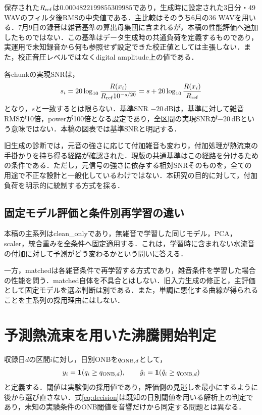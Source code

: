 保存された$R_{\rm ref}$は$0.0004822199855309985$であり，生成時に設定された3日分・49 WAVのフィルタ後RMSの中央値である\cite{localData}．主比較はそのうち6月の36 WAVを用いる．7月9日の録音は雑音基準の算出母集団に含まれるが，本稿の性能評価へ追加したものではない．この基準はデータ生成時の共通負荷を定義するものであり，実運用で未知録音から何も参照せず設定できた校正値としては主張しない．また，校正音圧レベルではなくdigital amplitude上の値である．

各chunkの実現SNRは，
\begin{equation}\label{eq:realized}
 s_i=20\log_{10}\frac{R(x_i)}{R_{\rm ref}10^{-s/20}}
 =s+20\log_{10}\frac{R(x_i)}{R_{\rm ref}}
\end{equation}
となり，$s$と一致するとは限らない．基準SNR $-20$\,dBは，基準に対して雑音RMSが10倍，powerが100倍となる設定であり，全区間の実現SNRが$-20$\,dBという意味ではない．本稿の図表では基準SNRと明記する．

旧生成の診断では，元音の強さに応じて付加雑音も変わり，付加処理が熱流束の手掛かりを持ち得る経路が確認された．現版の共通基準はこの経路を分けるための条件である．ただし，元信号の強さに依存する相対SNRそのものを，全ての用途で不正な設計と一般化しているわけではない．本研究の目的に対して，付加負荷を明示的に統制する方式を採る．

\subsection{固定モデル評価と条件別再学習の違い}
本稿の主系列はclean\_onlyであり，無雑音で学習した同じモデル，PCA，scaler，統合重みを全条件へ固定適用する．これは，学習時に含まれない水流音の付加に対して予測がどう変わるかという問いに答える．

一方，matchedは各雑音条件で再学習する方式であり，雑音条件を学習した場合の性能を問う．matched自体を不具合とはしない．旧入力生成の修正と，主評価として固定モデルを選ぶ判断は別である．また，単調に悪化する曲線が得られることを主系列の採用理由にはしない．

\section{予測熱流束を用いた沸騰開始判定}
収録日$d$の区間$i$に対し，日別ONBを$q_{\mathrm{ONB},d}$として，
\begin{equation}\label{eq:decision}
 y_i=\mathbf{1}(q_i\ge q_{\mathrm{ONB},d}),\qquad
 \hat y_i=\mathbf{1}(\hat q_i\ge q_{\mathrm{ONB},d})
\end{equation}
と定義する．閾値は実験側の採用値であり，評価側の見逃しを最小にするように後から選び直さない．式\eqref{eq:decision}は既知の日別閾値を用いる解析上の判定であり，未知の実験条件のONB閾値を音響だけから同定する問題とは異なる．

